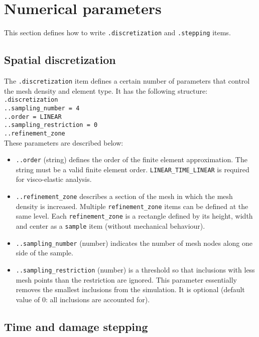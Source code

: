 \documentclass[10pt]{article}
\begin{document}
\eject

\section{Numerical parameters}

This section defines how to write \verb+.discretization+ and \verb+.stepping+ items.

\subsection{Spatial discretization}

The \verb+.discretization+ item defines a certain number of parameters that control the mesh density and element type.
It has the following structure:\\

\noindent \verb+.discretization+\\
\verb+..sampling_number = 4+\\
\verb+..order = LINEAR+\\
\verb+..sampling_restriction = 0+\\
\verb+..refinement_zone+\\

These parameters are described below:

\begin{itemize}[label=]
	\item \verb+..order+ (string) defines the order of the finite element approximation.
The string must be a valid finite element order.
\verb+LINEAR_TIME_LINEAR+ is required for visco-elastic analysis.
	\item \verb+..refinement_zone+ describes a section of the mesh in which the mesh density is increased. 
Multiple \verb+refinement_zone+ items can be defined at the same level. 
Each \verb+refinement_zone+ is a rectangle defined by its height, width and center as a \verb+sample+ item (without mechanical behaviour).
	\item \verb+..sampling_number+ (number) indicates the number of mesh nodes along one side of the sample.
	\item \verb+..sampling_restriction+ (number) is a threshold so that inclusions with less mesh points than the restriction are ignored.
This parameter essentially removes the smallest inclusions from the simulation.
It is optional (default value of 0: all inclusions are accounted for).
\end{itemize}

\subsection{Time and damage stepping}
\end{document}

